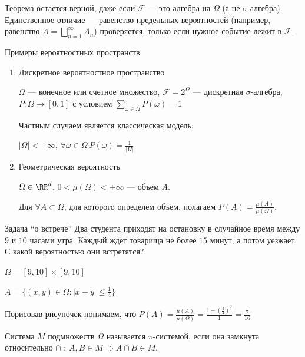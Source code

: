 \begin{remark}{}{}
    Теорема остается верной, даже если \( \mathcal{F} \) --- это алгебра на \( \Omega \)
    (а не \( \sigma \)-алгебра). Единственное отличие --- равенство
    предельных вероятностей (например, равенство \( A = \bigsqcup\limits_{n = 1}^{\infty} A_n \))
    проверяется, только если нужное событие лежит в \( \mathcal{F} \).
\end{remark}

\begin{example}{Примеры вероятностных пространств}{}
    \begin{enumerate}
        \item
            Дискретное вероятностное пространство

            \( \Omega \) --- конечное или счетное множество,
            \( \mathcal{F} = 2^{\Omega} \) --- дискретная \( \sigma \)-алгебра,
            \( P : \Omega \to [0, 1] \) с условием
            \( \sum\limits_{\omega \in \Omega} P(\omega) = 1 \)

            Частным случаем является классическая модель:

            \( |\Omega| < +\infty \), \( \forall \omega \in \Omega \ P(\omega) = \frac{1}{|\Omega|} \)
        \item
            Геометрическая вероятность

            \( \Omega \in \RR^d \), \( 0 < \mu(\Omega) < +\infty \) --- объем \( A \).

            Для \( \forall A \subset \Omega \),
            для которого определем объем, полагаем \( P(A) = \frac{\mu(A)}{\mu(\Omega)} \).
    \end{enumerate}
\end{example}

\begin{example}{Задача ``о встрече''}{}
    Два студента приходят на остановку в случайное время
    между \( 9 \) и \( 10 \) часами утра.
    Каждый ждет товарища не более \( 15 \) минут,
    а потом уезжает.
    С какой вероятностью они встретятся?
\end{example}

\( \Omega = [9, 10] \times [9, 10] \)

\( A = \{ (x, y) \in \Omega : |x - y| \leq \frac{1}{4} \} \)

Порисовав рисуночек понимаем, что
\( P(A) = \frac{\mu(A)}{\mu(\Omega)} = \frac{1 - \left( \frac{3}{4} \right)^2}{1} = \frac{7}{16} \)

\begin{defn}{}{}
    Система \( M \) подмножеств \( \Omega \) называется \( \pi \)-системой,
    если она замкнута относительно \( \cap \) : \( A, B \in M \Rightarrow A \cap B \in M \).
\end{defn}

